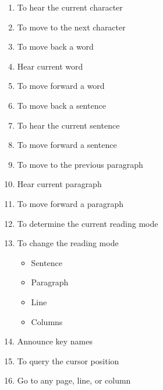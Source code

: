 \documentclass[10pt,letterpaper,twoside]{report}
\begin{document}
{{{\begin{enumerate}
\begin{enumerate}
			\item To hear the current character 
			\item To move to the next character 
			\item To move back a word 
			\item Hear current word 
			\item To move forward a word 
			\item To move back a sentence
			\item To hear the current sentence 
			\item To move forward a sentence 
			\item To move to the previous paragraph 
			\item Hear current paragraph 
			\item To move forward a paragraph 
			\item To determine the current reading mode 
			\item To change the reading mode
			    \begin{itemize}
			        \item Sentence
			        \item Paragraph
			        \item Line 
			        \item Columns
			    \end{itemize}
			\item Announce key names 
			\item To query the cursor position 
			\item Go to any page, line, or column 

\end{enumerate}
\end{enumerate}}}}
\end{document}
